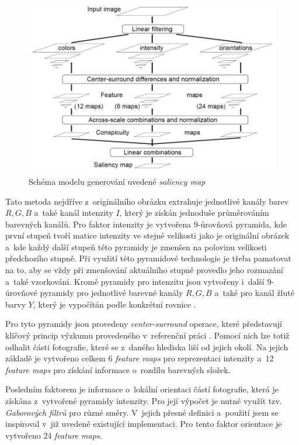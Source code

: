 \begin{figure}[H]
	\centering
    \includegraphics[scale=0.75]{obrazky/itti_schema.jpg}
    \caption{Schéma modelu generování uvedené \emph{saliency map} \cite{Itti1998}}
    \label{obr:itti_schema}
\end{figure}

Tato metoda nejdříve z~originálního obrázku extrahuje jednotlivé kanály barev $R,G,B$ a~také kanál intenzity $I$, který je získán jednoduše průměrováním barevných kanálů. Pro faktor intenzity je vytvořena 9-úrovňová pyramida, kde první stupeň tvoří matice intenzity ve stejné velikosti jako je originální obrázek a~kde každý další stupeň této pyramidy je zmenšen na polovinu velikosti předchozího stupně. Při využití této pyramidové technologie je třeba pamatovat na to, aby se vždy při zmenšování aktuálního stupně provedlo jeho rozmazání a~také vzorkování. Kromě pyramidy pro intenzitu jsou vytvořeny i~další 9-úrovňové pyramidy pro jednotlivé barevné kanály $R,G,B$ a~také pro kanál žluté barvy $Y$, který je vypočítán podle konkrétní rovnice \cite{Itti1998}.

Pro tyto pyramidy jsou provedeny \emph{center-surround} operace, které představují klíčový princip výzkumu provedeného v~referenční práci \cite{Itti1998}. Pomocí nich lze totiž odhalit části fotografie, které se z~daného hlediska liší od jejich okolí. Na jejich základě je vytvořeno celkem 6 \emph{feature maps} pro reprezentaci intenzity a~12 \emph{feature maps} pro získání informace o~rozdílu barevných složek. 

Posledním faktorem je informace o~lokální orientaci částí fotografie, která je získána z~vytvořené pyramidy intenzity. Pro její výpočet je nutné využít tzv. \emph{Gaborových filtrů} pro různé směry. V~jejich přesné definici a~použití jsem se inspiroval v~již uvedené existující implementaci. Pro tento faktor orientace je vytvořeno 24 \emph{feature maps}. 

